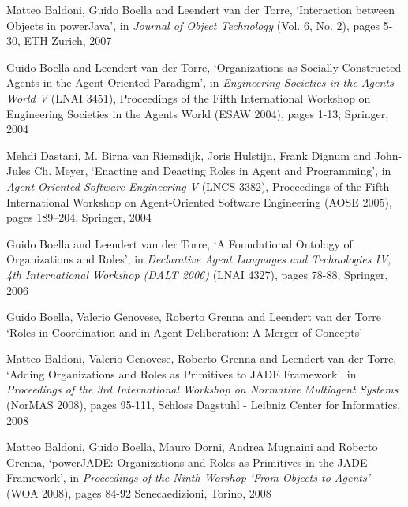 \begin{thebibliography}{99}
Matteo Baldoni, Guido Boella and Leendert van der Torre,
`Interaction between Objects in powerJava',
in \textit{Journal of Object Technology} (Vol. 6, No. 2),
pages 5-30,
ETH Zurich, 2007


Guido Boella and Leendert van der Torre,
`Organizations as Socially Constructed Agents in the Agent Oriented Paradigm',
in \textit{Engineering Societies in the Agents World V} (LNAI 3451),
Proceedings of the Fifth International Workshop on Engineering Societies in the Agents World (ESAW 2004),
pages 1-13,
Springer, 2004

Mehdi Dastani, M. Birna van Riemsdijk, Joris Hulstijn, Frank Dignum and John-Jules Ch. Meyer,
`Enacting and Deacting Roles in Agent and Programming',
in \textit{Agent-Oriented Software Engineering V} (LNCS 3382),
Proceedings of the Fifth International Workshop on Agent-Oriented Software Engineering (AOSE 2005),
pages 189–204,
Springer, 2004

Guido Boella and Leendert van der Torre,
`A Foundational Ontology of Organizations and Roles',
in \textit{Declarative Agent Languages and Technologies IV, 4th International Workshop (DALT 2006)} (LNAI 4327),
pages 78-88,
Springer, 2006

Guido Boella, Valerio Genovese, Roberto Grenna and Leendert van der Torre
`Roles in Coordination and in Agent Deliberation: A Merger of Concepts'


Matteo Baldoni, Valerio Genovese, Roberto Grenna and Leendert van der Torre,
`Adding Organizations and Roles as Primitives to JADE Framework',
in \textit{Proceedings of the 3rd International Workshop on Normative Multiagent Systems} (NorMAS 2008),
pages 95-111,
Schloss Dagstuhl - Leibniz Center for Informatics, 2008

Matteo Baldoni, Guido Boella, Mauro Dorni, Andrea Mugnaini and Roberto Grenna,
`powerJADE: Organizations and Roles as Primitives in the JADE Framework',
in \textit{Proceedings of the Ninth Worshop `From Objects to Agents'} (WOA 2008),
pages 84-92
Senecaedizioni, Torino, 2008


\end{thebibliography}
